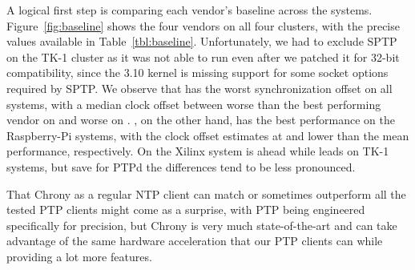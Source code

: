 


A logical first step is comparing each vendor's baseline across the systems. Figure~\ref{fig:baseline} shows the four vendors on all four clusters, with the precise values available in Table~\ref{tbl:baseline}. Unfortunately, we had to exclude SPTP on the TK-1 cluster as it was not able to run even after we patched it for 32-bit compatibility, since the 3.10 kernel is missing support for some socket options required by SPTP. We observe that  has the worst synchronization offset on all systems, with a median clock offset between  worse than the best performing vendor on  and  worse on .
, on the other hand, has the best performance on the Raspberry-Pi systems, with the clock offset estimates at  and  lower than the mean performance, respectively. On the Xilinx system  is ahead while  leads on TK-1 systems, but save for PTPd the differences tend to be less pronounced.

%
That Chrony as a regular NTP client can match or sometimes outperform all the tested PTP clients might come as a surprise, with PTP being engineered specifically for precision, but Chrony is very much state-of-the-art and can take advantage of the same hardware acceleration that our PTP clients can while providing a lot more features.

